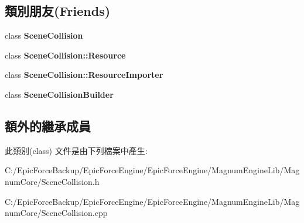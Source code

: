 \subsection*{類別朋友(Friends)}
\begin{DoxyCompactItemize}
\item 
class {\bfseries Scene\+Collision}\hypertarget{class_magnum_1_1_scene_collision_1_1_resource_importer_a7f7f4483f99e66d8de91c12344383316}{}\label{class_magnum_1_1_scene_collision_1_1_resource_importer_a7f7f4483f99e66d8de91c12344383316}

\item 
class {\bfseries Scene\+Collision\+::\+Resource}\hypertarget{class_magnum_1_1_scene_collision_1_1_resource_importer_a71b236c1c24fec68b8fc80e32c6a1df9}{}\label{class_magnum_1_1_scene_collision_1_1_resource_importer_a71b236c1c24fec68b8fc80e32c6a1df9}

\item 
class {\bfseries Scene\+Collision\+::\+Resource\+Importer}\hypertarget{class_magnum_1_1_scene_collision_1_1_resource_importer_a7892633f22a5e0a8a9dcf89bb56cdff8}{}\label{class_magnum_1_1_scene_collision_1_1_resource_importer_a7892633f22a5e0a8a9dcf89bb56cdff8}

\item 
class {\bfseries Scene\+Collision\+Builder}\hypertarget{class_magnum_1_1_scene_collision_1_1_resource_importer_a2d946a399a3297cd5ab77a3604b6211e}{}\label{class_magnum_1_1_scene_collision_1_1_resource_importer_a2d946a399a3297cd5ab77a3604b6211e}

\end{DoxyCompactItemize}
\subsection*{額外的繼承成員}


此類別(class) 文件是由下列檔案中產生\+:\begin{DoxyCompactItemize}
\item 
C\+:/\+Epic\+Force\+Backup/\+Epic\+Force\+Engine/\+Epic\+Force\+Engine/\+Magnum\+Engine\+Lib/\+Magnum\+Core/Scene\+Collision.\+h\item 
C\+:/\+Epic\+Force\+Backup/\+Epic\+Force\+Engine/\+Epic\+Force\+Engine/\+Magnum\+Engine\+Lib/\+Magnum\+Core/Scene\+Collision.\+cpp\end{DoxyCompactItemize}
